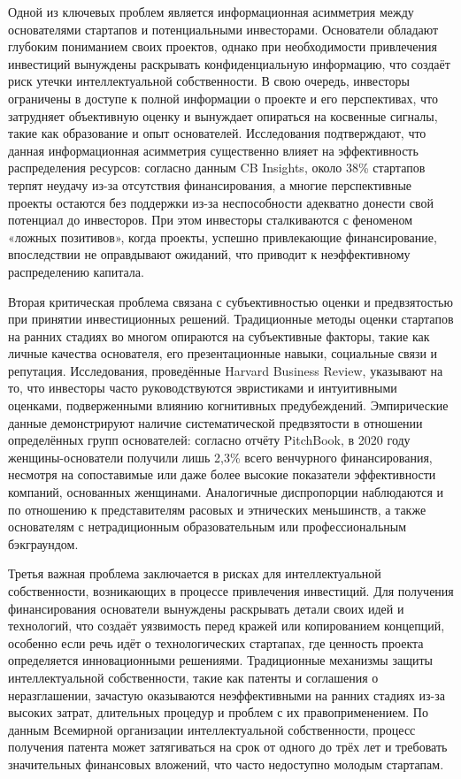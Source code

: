 \documentclass[
    14pt,
    specialist,
    candidate, %
    subf, %
    href,
    dotsinheaders=false
]{disser}
\begin{document}
Одной из ключевых проблем является информационная асимметрия между основателями стартапов и потенциальными инвесторами. Основатели обладают глубоким пониманием своих проектов, однако при необходимости привлечения инвестиций вынуждены раскрывать конфиденциальную информацию, что создаёт риск утечки интеллектуальной собственности. В свою очередь, инвесторы ограничены в доступе к полной информации о проекте и его перспективах, что затрудняет объективную оценку и вынуждает опираться на косвенные сигналы, такие как образование и опыт основателей. Исследования подтверждают, что данная информационная асимметрия существенно влияет на эффективность распределения ресурсов: согласно данным CB Insights, около 38\% стартапов терпят неудачу из-за отсутствия финансирования, а многие перспективные проекты остаются без поддержки из-за неспособности адекватно донести свой потенциал до инвесторов. При этом инвесторы сталкиваются с феноменом «ложных позитивов», когда проекты, успешно привлекающие финансирование, впоследствии не оправдывают ожиданий, что приводит к неэффективному распределению капитала.

Вторая критическая проблема связана с субъективностью оценки и предвзятостью при принятии инвестиционных решений. Традиционные методы оценки стартапов на ранних стадиях во многом опираются на субъективные факторы, такие как личные качества основателя, его презентационные навыки, социальные связи и репутация. Исследования, проведённые Harvard Business Review, указывают на то, что инвесторы часто руководствуются эвристиками и интуитивными оценками, подверженными влиянию когнитивных предубеждений. Эмпирические данные демонстрируют наличие систематической предвзятости в отношении определённых групп основателей: согласно отчёту PitchBook, в 2020 году женщины-основатели получили лишь 2,3\% всего венчурного финансирования, несмотря на сопоставимые или даже более высокие показатели эффективности компаний, основанных женщинами. Аналогичные диспропорции наблюдаются и по отношению к представителям расовых и этнических меньшинств, а также основателям с нетрадиционным образовательным или профессиональным бэкграундом.

Третья важная проблема заключается в рисках для интеллектуальной собственности, возникающих в процессе привлечения инвестиций. Для получения финансирования основатели вынуждены раскрывать детали своих идей и технологий, что создаёт уязвимость перед кражей или копированием концепций, особенно если речь идёт о технологических стартапах, где ценность проекта определяется инновационными решениями. Традиционные механизмы защиты интеллектуальной собственности, такие как патенты и соглашения о неразглашении, зачастую оказываются неэффективными на ранних стадиях из-за высоких затрат, длительных процедур и проблем с их правоприменением. По данным Всемирной организации интеллектуальной собственности, процесс получения патента может затягиваться на срок от одного до трёх лет и требовать значительных финансовых вложений, что часто недоступно молодым стартапам.
\end{document}
